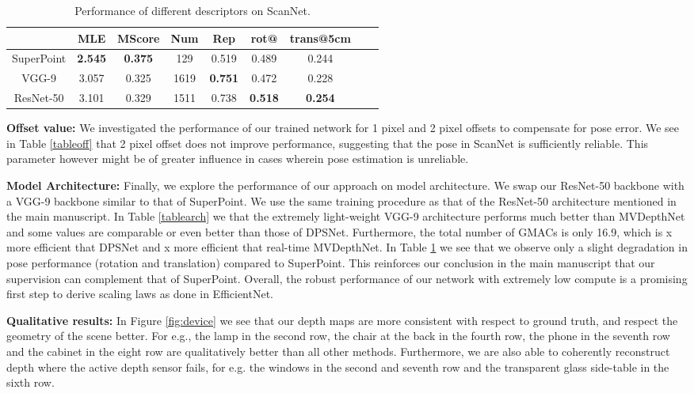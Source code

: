 \documentclass[runningheads]{llncs}
\begin{document}
\begin{table}
  \caption{Performance of different descriptors on ScanNet.}
  \centering
\begin{tabular}{ccccccccc}
  \hline
&\textbf{MLE}  &\textbf{MScore} & \textbf{Num} & \textbf{Rep}& \textbf{rot@}& \textbf{trans@5cm}\\

    \hline
SuperPoint  &  \textbf{2.545} &     \textbf{0.375}  &   129  & 0.519	&  0.489 &      0.244 \\
VGG-9 &	3.057 &		0.325  &   1619  & \textbf{0.751} &  0.472 &		0.228	\\
ResNet-50 &	 3.101 &   0.329   &  1511  & 0.738 &  \textbf{0.518} &\textbf{0.254} 	\\
\hline
  \end{tabular}
  \label{tabledd}
\end{table}

\vspace{4mm}
\noindent
\textbf{Offset value:} We investigated the performance of our trained network for 1 pixel and 2 pixel offsets to compensate for pose error. We see in Table \ref{tableoff} that 2 pixel offset does not improve performance, suggesting that the pose in ScanNet is sufficiently reliable. This parameter however might be of greater influence in cases wherein pose estimation is unreliable.

\vspace{4mm}
\noindent
\textbf{Model Architecture:} Finally, we explore the performance of our approach on model architecture. We swap our ResNet-50 backbone with a VGG-9 backbone similar to that of SuperPoint. We use the same training procedure as that of the ResNet-50 architecture mentioned in the main manuscript. In Table \ref{tablearch} we that the extremely light-weight VGG-9 architecture performs much better than MVDepthNet and some values are comparable or even better than those of DPSNet. Furthermore, the total number of GMACs is only 16.9, which is x more efficient that DPSNet and  x more efficient that real-time MVDepthNet. In Table \ref{tabledd} we see that we observe only a slight degradation in pose performance (rotation and translation) compared to SuperPoint. This reinforces our conclusion in the main manuscript that our supervision can complement that of SuperPoint. Overall, the robust performance of our network with extremely low compute is a promising first step to derive scaling laws as done in EfficientNet.    

\vspace{4mm}
\noindent
\textbf{Qualitative results:} In Figure \ref{fig:device} we see that our depth maps are more consistent with respect to ground truth, and respect the geometry of the scene better. For e.g., the lamp in the second row, the chair at the back in the fourth row, the phone in the seventh row and the cabinet in the eight row are qualitatively better than all other methods. Furthermore, we are also able to coherently reconstruct depth where the active depth sensor fails, for e.g. the windows in the second and seventh row and the transparent glass side-table in the sixth row. 
\end{document}
